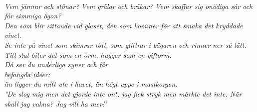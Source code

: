 \documentclass[a6paper,10pt]{article}
\begin{document}
\noindent
{}\\
\newline
\large\textit{\indent Vem jämrar och stönar? Vem grälar och bråkar? Vem skaffar sig onödiga sår och får simmiga ögon? \\
\indent Den som blir sittande vid glaset, den som kommer för att smaka det kryddade vinet. \\
\indent Se inte på vinet som skimrar rött, som glittrar i bägaren
och rinner ner så lätt.\\
\indent Till slut biter det som en orm,
hugger som en giftorm. \\
\indent Då ser du underliga syner och får \\befängda idéer:\\
\indent än ligger du mitt ute i havet, än högt uppe i mastkorgen.\\
\indent "De slog mig men det gjorde inte ont,
jag fick stryk men märkte det inte.
När skall jag vakna?
Jag vill ha mer!"}
\end{document}
